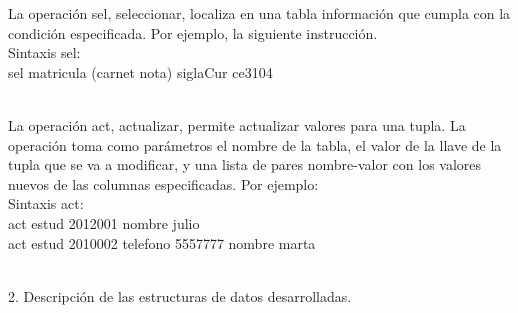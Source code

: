 \documentclass[12pt,a4paper]{report}
\begin{document}
\begin{flushleft}
La operación sel, seleccionar, localiza en una tabla información que cumpla con la condición especificada. Por ejemplo, la siguiente instrucción.\\
Sintaxis sel:\\
sel matricula (carnet nota) siglaCur ce3104\\\

La operación act, actualizar, permite actualizar valores para una tupla. La operación toma como parámetros el nombre de la tabla, el valor de la 
llave de la tupla que se va a modificar, y una lista de pares nombre-valor con los valores nuevos de las columnas especificadas. Por ejemplo:\\
Sintaxis act:\\
act estud 2012001 nombre julio \\
act estud 2010002 telefono 5557777 nombre marta\\\




 





\end{flushleft}

\begin{flushleft}

2. Descripción de las estructuras de datos desarrolladas.

\end{flushleft}
\end{document}
